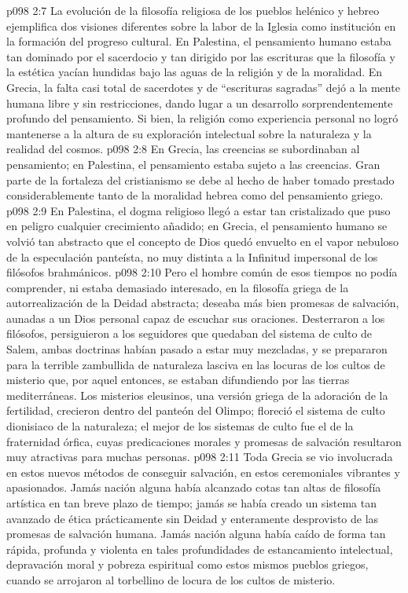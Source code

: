 \vs p098 2:7 \pc La evolución de la filosofía religiosa de los pueblos helénico y hebreo ejemplifica dos visiones diferentes sobre la labor de la Iglesia como institución en la formación del progreso cultural. En Palestina, el pensamiento humano estaba tan dominado por el sacerdocio y tan dirigido por las escrituras que la filosofía y la estética yacían hundidas bajo las aguas de la religión y de la moralidad. En Grecia, la falta casi total de sacerdotes y de “escrituras sagradas” dejó a la mente humana libre y sin restricciones, dando lugar a un desarrollo sorprendentemente profundo del pensamiento. Si bien, la religión como experiencia personal no logró mantenerse a la altura de su exploración intelectual sobre la naturaleza y la realidad del cosmos.
\vs p098 2:8 En Grecia, las creencias se subordinaban al pensamiento; en Palestina, el pensamiento estaba sujeto a las creencias. Gran parte de la fortaleza del cristianismo se debe al hecho de haber tomado prestado considerablemente tanto de la moralidad hebrea como del pensamiento griego.
\vs p098 2:9 En Palestina, el dogma religioso llegó a estar tan cristalizado que puso en peligro cualquier crecimiento añadido; en Grecia, el pensamiento humano se volvió tan abstracto que el concepto de Dios quedó envuelto en el vapor nebuloso de la especulación panteísta, no muy distinta a la Infinitud impersonal de los filósofos brahmánicos.
\vs p098 2:10 \pc Pero el hombre común de esos tiempos no podía comprender, ni estaba demasiado interesado, en la filosofía griega de la autorrealización de la Deidad abstracta; deseaba más bien promesas de salvación, aunadas a un Dios personal capaz de escuchar sus oraciones. Desterraron a los filósofos, persiguieron a los seguidores que quedaban del sistema de culto de Salem, ambas doctrinas habían pasado a estar muy mezcladas, y se prepararon para la terrible zambullida de naturaleza lasciva en las locuras de los cultos de misterio que, por aquel entonces, se estaban difundiendo por las tierras mediterráneas. Los misterios eleusinos, una versión griega de la adoración de la fertilidad, crecieron dentro del panteón del Olimpo; floreció el sistema de culto dionisiaco de la naturaleza; el mejor de los sistemas de culto fue el de la fraternidad órfica, cuyas predicaciones morales y promesas de salvación resultaron muy atractivas para muchas personas.
\vs p098 2:11 Toda Grecia se vio involucrada en estos nuevos métodos de conseguir salvación, en estos ceremoniales vibrantes y apasionados. Jamás nación alguna había alcanzado cotas tan altas de filosofía artística en tan breve plazo de tiempo; jamás se había creado un sistema tan avanzado de ética prácticamente sin Deidad y enteramente desprovisto de las promesas de salvación humana. Jamás nación alguna había caído de forma tan rápida, profunda y violenta en tales profundidades de estancamiento intelectual, depravación moral y pobreza espiritual como estos mismos pueblos griegos, cuando se arrojaron al torbellino de locura de los cultos de misterio.
